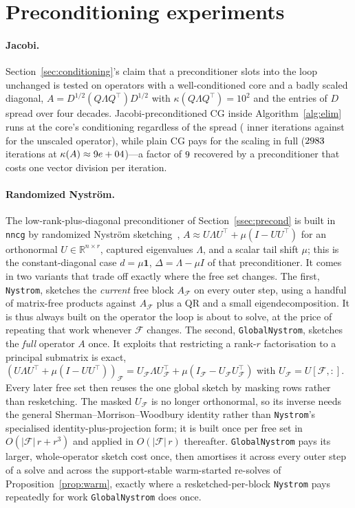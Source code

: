 \section{Preconditioning experiments}\label{app:precond}

\paragraph{Jacobi.}
Section~\ref{sec:conditioning}'s claim that a preconditioner slots into the loop unchanged is
tested on operators with a well-conditioned core and a badly scaled diagonal,
$A = D^{1/2}(Q\Lambda Q^\top)D^{1/2}$ with $\kappa(Q\Lambda Q^\top) = 10^2$ and the entries of
$D$ spread over four decades. Jacobi-preconditioned CG inside Algorithm~\ref{alg:elim} runs at
the core's conditioning regardless of the spread (\nncgPcgPCG{} inner iterations against
\nncgPcgBase{} for the unscaled operator), while plain CG pays for the scaling in full
($2983$ iterations at $\kappa(A) \approx 9e+04$)---a factor of $9$
recovered by a preconditioner that costs one vector division per iteration.

\paragraph{Randomized Nyström.}
The low-rank-plus-diagonal preconditioner of Section~\ref{ssec:precond} is built in \texttt{nncg}
by randomized Nyström sketching~\cite{halko2011}, $A \approx U\Lambda U^\top + \mu(I - UU^\top)$
for an orthonormal $U \in \mathbb{R}^{n \times r}$, captured eigenvalues $\Lambda$, and a scalar
tail shift $\mu$; this is the constant-diagonal case $d = \mu\mathbf{1}$,
$\Delta = \Lambda - \mu I$ of that preconditioner. It comes in two variants that trade off
exactly where the free set changes. The first, \texttt{Nystrom}, sketches the \emph{current}
free block $A_{\mathcal{F}}$ on every outer step, using a handful of matrix-free products
against $A_{\mathcal{F}}$ plus a QR and a small eigendecomposition. It is thus always built on
the operator the loop is about to solve, at the price of repeating that work whenever
$\mathcal{F}$ changes. The second, \texttt{GlobalNystrom}, sketches the \emph{full} operator $A$
once. It exploits that restricting a rank-$r$ factorisation to a principal submatrix is exact,
$(U\Lambda U^\top + \mu(I-UU^\top))_{\mathcal{F}} = U_{\mathcal{F}}\Lambda U_{\mathcal{F}}^\top +
\mu(I_{\mathcal{F}} - U_{\mathcal{F}} U_{\mathcal{F}}^\top)$ with $U_{\mathcal{F}} =
U[\mathcal{F},:]$. Every later free set then reuses the one global sketch by masking rows rather
than resketching. The masked $U_{\mathcal{F}}$ is no longer orthonormal, so its inverse needs the
general Sherman--Morrison--Woodbury identity rather than \texttt{Nystrom}'s specialised
identity-plus-projection form; it is built once per free set in $O(|\mathcal{F}|\,r + r^3)$ and
applied in $O(|\mathcal{F}|\,r)$ thereafter. \texttt{GlobalNystrom} pays its larger,
whole-operator sketch cost once, then amortises it across every outer step of a solve and across
the support-stable warm-started re-solves of Proposition~\ref{prop:warm}, exactly where a
resketched-per-block \texttt{Nystrom} pays repeatedly for work \texttt{GlobalNystrom} does once.

